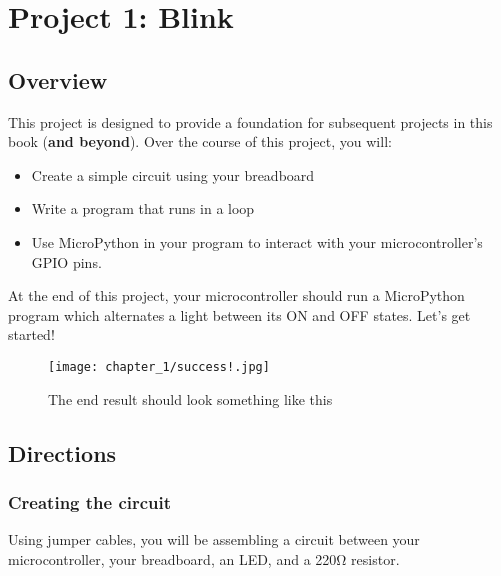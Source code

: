 \chapter{Project 1: Blink}

\section{Overview}
This project is designed to provide a foundation for subsequent projects in this book (\textbf{and beyond}). Over the course of this project, you will:
\begin{itemize}
\item Create a simple circuit using your breadboard
\item Write a program that runs in a loop
\item Use MicroPython in your program to interact with your microcontroller's GPIO pins.
\end{itemize}
At the end of this project, your microcontroller should run a MicroPython program which alternates a light between its ON and OFF states. Let's get started!
\begin{figure}[h!]
\centering
    \texttt{[image: chapter\_1/success!.jpg]}
    \caption{The end result should look something like this}
    \label{fig:end_result}
\end{figure}

\section{Directions}

\subsection{Creating the circuit}
Using jumper cables, you will be assembling a circuit between your microcontroller, your breadboard, an LED, and a 220\si{\ohm} resistor.

